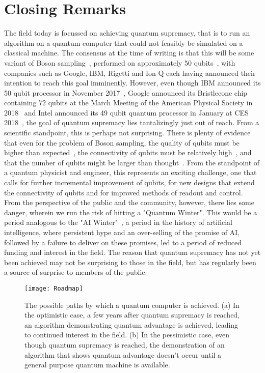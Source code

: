 \section{Closing Remarks}
The field today is focussed on achieving quantum supremacy, that is to run an algorithm on a quantum computer that could not feasibly be
simulated on a classical machine. The consensus at the time of writing is that this will be some variant of Boson sampling~\cite{Aaronson:2011},
performed on approximately 50 qubits~\cite{savage,8322045,10.1038/s41567-018-0131-y}, with companies such as Google, IBM, Rigetti and Ion-Q each having
announced their intention to reach this goal imminently. However, even though IBM announced its 50 qubit processor in November 2017~\cite{ibmq}, Google announced
its Bristlecone chip containing 72 qubits at the March Meeting of the American Physical Society in 2018~\cite{bristlecone,Neill195} and Intel announced
its 49 qubit quantum processor in January at CES 2018~\cite{intelq}, the goal of quantum supremacy lies tantalizingly just out of reach. From a scientific standpoint,
this is perhaps not surprising. There is plenty of evidence that even for the problem of Boson sampling, the quality of qubits must be higher
than expected~\cite{PhysRevX.6.021039,PhysRevLett.117.080501}, the connectivity of qubits must be relatively high~\cite{s41567-018-0124-x},
and that the number of qubits might be larger than thought~\cite{2017arXiv171005867P}.
From the standpoint of a quantum physicist and engineer, this represents an exciting challenge, one that calls for further incremental improvement of qubits,
for new designs that extend the connectivity of qubits and for improved methods of readout and control. From the perspective of the public and the community, however,
there lies some danger, wherein we run the risk of hitting a "Quantum Winter". This would be a period analogous to the "AI Winter"~\cite{crevier1993ai},
a period in the history of artificial intelligence, where persistent hype and an over-selling of the promise of AI, followed by a failure to deliver on these promises,
led to a period of reduced funding and interest in the field. The reason that quantum supremacy has not yet been achieved may not be surprising to those in the
field, but has regularly been a source of surprise to members of the public.

\begin{figure}
    \texttt{[image: Roadmap]}
    \caption[Roadmap to a quantum computer]{\label{fig:roadmap} The possible paths by which a quantum computer is achieved. (a) In the optimistic case, a few years after
    quantum supremacy is reached, an algorithm demonstrating quantum advantage is achieved, leading to continued interest in the field. (b) In the pessimistic case,
    even though quantum supremacy is reached, the demonstration of an algorithm that shows quantum advantage doesn't occur until a general purpose quantum machine is available.}
\end{figure}

